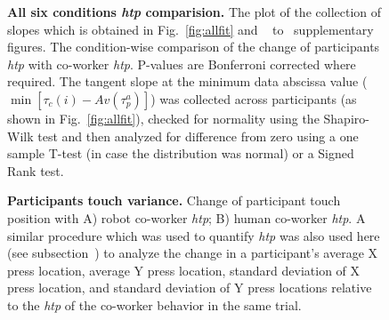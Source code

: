 \begin{figure}[hpt]
	\caption{{\bf All six conditions \textit{htp} comparision.} The plot of the collection of slopes which is obtained in Fig.~\ref{fig:allfit} and ~ to~ supplementary figures. The condition-wise comparison of the change of participants {\it htp} with co-worker {\it htp}. P-values are Bonferroni corrected where required. The tangent slope at the minimum data abscissa value ($\min[\tau_c(i)-Av(\tau_p^a)]$) was collected across participants (as shown in Fig.~\ref{fig:allfit}), checked for normality using the Shapiro-Wilk test and then analyzed for difference from zero using a one sample T-test (in case the distribution was normal) or a Signed Rank test.}
	\label{fig:slope_allcond}
\end{figure}



\begin{figure}[hpt]
	\caption{{\bf Participants touch variance.} Change of participant touch position with A) robot co-worker {\it htp}; B) human co-worker {\it htp}. A similar procedure which was used to quantify {\it htp} was also used here (see subsection~) to analyze the change in a participant's average X press location, average Y press location, standard deviation of X press location, and standard deviation of Y press locations relative to the {\it htp} of the co-worker behavior in the same trial.}
	\label{fig:variance}
\end{figure}


